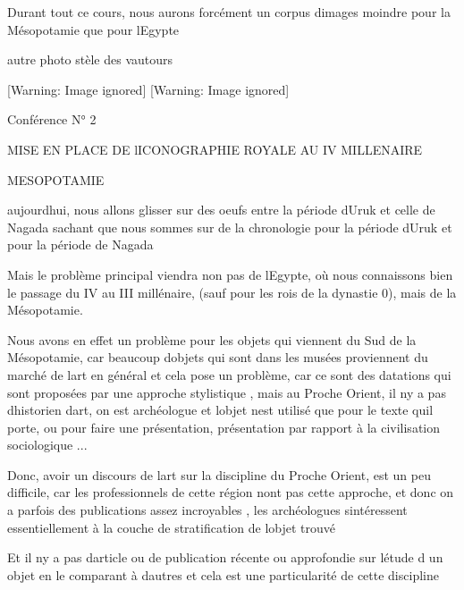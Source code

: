\documentclass{article}
\begin{document}
Durant tout ce cours, nous aurons forcément un corpus
d{\textquotesingle}images moindre pour la Mésopotamie que pour
l{\textquotesingle}Egypte

autre photo stèle des vautours

  [Warning: Image ignored] %
   [Warning: Image ignored] %
 

Conférence N° 2

MISE EN PLACE DE l{\textquotesingle}ICONOGRAPHIE ROYALE AU IV MILLENAIRE

MESOPOTAMIE

aujourd{\textquotesingle}hui, nous allons glisser sur des oeufs entre la
période d{\textquotesingle}Uruk et celle de Nagada sachant que nous
sommes sur de la chronologie pour la période d{\textquotesingle}Uruk et
pour la période de Nagada

Mais le problème principal viendra non pas de l{\textquotesingle}Egypte,
où nous connaissons bien le passage du IV au III millénaire, (sauf pour
les rois de la dynastie 0), mais de la Mésopotamie.

Nous avons en effet un problème pour les objets qui viennent du Sud de
la Mésopotamie, car beaucoup d{\textquotesingle}objets qui sont dans
les musées proviennent du marché de l{\textquotesingle}art en général
et cela pose un problème, car ce sont des datations qui sont proposées
par une approche stylistique , mais au Proche Orient, il
n{\textquotesingle}y a pas d{\textquotesingle}historien
d{\textquotesingle}art, on est archéologue et l{\textquotesingle}objet
n{\textquotesingle}est utilisé que pour le texte qu{\textquotesingle}il
porte, ou pour faire une présentation, présentation par rapport à la
civilisation sociologique ...

Donc, avoir un discours de l{\textquotesingle}art sur la discipline du
Proche Orient, est un peu difficile, car les professionnels de cette
région n{\textquotesingle}ont pas cette approche, et donc on a parfois
des publications assez incroyables , les archéologues
s{\textquotesingle}intéressent essentiellement à la couche de
stratification de l{\textquotesingle}objet trouvé

Et il n{\textquotesingle}y a pas d{\textquotesingle}article ou de
publication récente ou approfondie sur l{\textquotesingle}étude d
{\textquotesingle}un objet en le comparant à d{\textquotesingle}autres
et cela est une particularité de cette discipline
\end{document}
